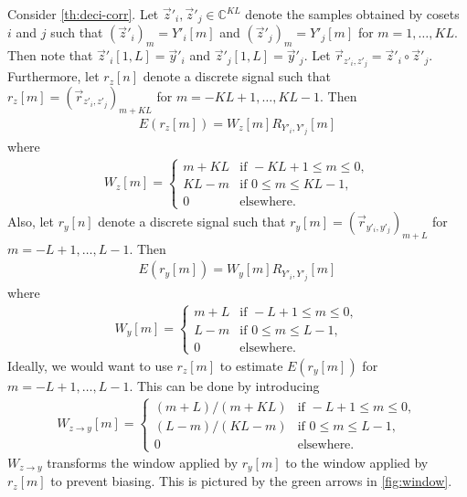 \documentclass[a4paper, openany, oneside]{memoir}
\begin{document}
Consider \cref{th:deci-corr}. Let $\vec{z}'_i, \vec{z}'_j \in \mathbb{C}^{KL}$ denote the samples obtained by cosets $i$ and $j$ such that $(\vec{z}'_i)_m = Y'_i[m]$ and $(\vec{z}'_j)_m=Y'_j[m]$ for $m = 1,\ldots,KL$. Then note that $\vec{z}'_i[1,L]=\vec{y}'_i$ and $\vec{z}'_j[1,L]=\vec{y}'_j$. Let $\vec{r}_{z'_i,z'_j} = \vec{z}'_i \circ \vec{z}'_j$. Furthermore, let $r_z[n]$ denote a discrete signal such that $r_z[m] = (\vec{r}_{z'_i,z'_j})_{m+KL}$ for $m = -KL+1,\ldots,KL-1$. Then
\begin{align*}
    E(r_z[m]) = W_z[m]R_{Y'_i,Y'_j}[m]
\end{align*}
where
\begin{align*}
    W_z[m] = \begin{cases}
        m + KL & \text{if } -KL + 1 \le m \le 0, \\
        KL - m & \text{if } 0 \le m \le KL - 1, \\
        0 & \text{elsewhere.}
    \end{cases}
\end{align*}
Also, let $r_y[n]$ denote a discrete signal such that $r_y[m] = (\vec{r}_{y'_i,y'_j})_{m+L}$ for $m = -L+1,\ldots,L-1$. Then
\begin{align*}
    E(r_y[m]) = W_y[m]R_{Y'_i,Y'_j}[m]
\end{align*}
where
\begin{align*}
    W_y[m] = \begin{cases}
        m + L & \text{if } -L+1 \le m \le 0, \\
        L - m & \text{if } 0 \le m \le L - 1, \\
        0 & \text{elsewhere.}
    \end{cases}
\end{align*}
Ideally, we would want to use $r_z[m]$ to estimate $E(r_y[m])$ for $m = -L+1,\ldots,L-1$. This can be done by introducing
\begin{align*}
    W_{z \to y}[m] = \begin{cases}
        (m + L)/(m + KL) & \text{if } -L+1 \le m \le 0, \\
        (L - m)/(KL - m) & \text{if } 0 \le m \le L - 1, \\
        0 & \text{elsewhere.}
    \end{cases}
\end{align*}
$W_{z \to y}$ transforms the window applied by $r_y[m]$ to the window applied by $r_z[m]$ to prevent biasing. This is pictured by the green arrows in \cref{fig:window}.
\end{document}
